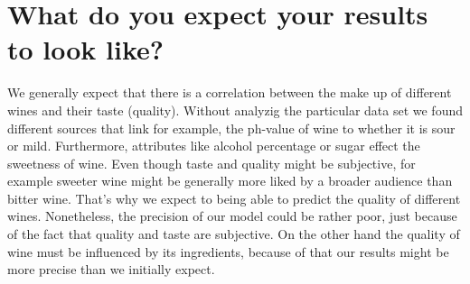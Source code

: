 \documentclass[11pt,titlepage,oneside,openany]{article}
\begin{document}
\section{What do you expect your results to look like?}
We generally expect that there is a correlation between the make up of different wines and their taste (quality). Without analyzig the particular data set we found different sources that link for example, the ph-value of wine to whether it is sour or mild. Furthermore, attributes like alcohol percentage or sugar effect the sweetness of wine. Even though taste and quality might be subjective, for example sweeter wine might be generally more liked by a broader audience than bitter wine. That's why we expect to being able to predict the quality of different wines. Nonetheless, the precision of our model could be rather poor, just because of the fact that quality and taste are subjective. On the other hand the quality of wine must be influenced by its ingredients, because of that our results might be more precise than we initially expect.

%
%









\end{document}
